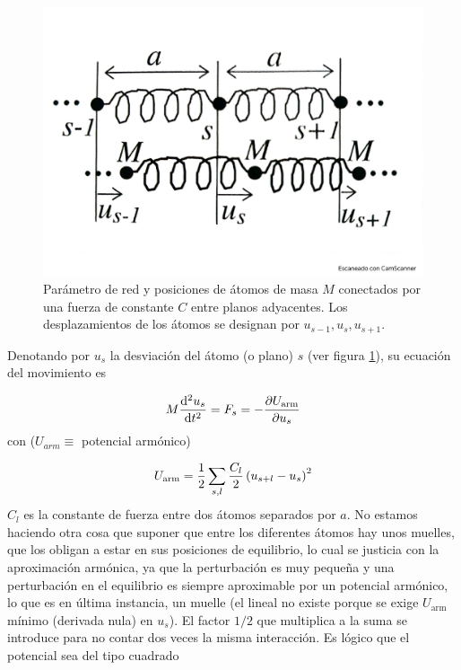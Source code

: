 \begin{figure}[h!] \centering
    \includegraphics[scale=0.35]{Cuerpo/Ch_04/Fotos libro 1.pdf}
    \caption{Parámetro de red y posiciones de átomos de masa $M$ conectados por una fuerza de constante $C$ entre planos adyacentes. Los desplazamientos de los átomos se designan por $u_{s-1},u_{s},u_{s+1}$.}
    \label{Fig:04-01}
\end{figure}    

Denotando por $u_s$ la desviación del átomo (o plano) $s$ (ver figura \ref{Fig:04-01}), su ecuación del movimiento es

\begin{equation}
	M \frac{\mathrm{d} ^2 u_s}{\mathrm{d} t^2} = F_s = - \frac{\partial U_{\text{arm}}}{\partial u_s} \label{Ec:04-01-02}
\end{equation}
con ($U_{arm} \equiv$ potencial armónico)

\begin{equation}
	U_{\text{arm}} = \frac{1}{2} \sum_{s,l} \frac{C_l}{2} \left( u_{s+l}-u_s \right)^2
\end{equation}
$C_l$ es la constante de fuerza entre dos átomos separados por $a$. No estamos haciendo otra cosa que suponer que entre los diferentes átomos hay unos muelles,  que los obligan a estar en sus posiciones de equilibrio, lo cual se justicia con la aproximación armónica, ya que la perturbación es muy pequeña y una perturbación en el equilibrio es siempre aproximable por un potencial armónico, lo que es en última instancia, un muelle (el lineal no existe porque se exige $U_{\text{arm}}$ mínimo (derivada nula) en $u_s$). El factor $1/2$ que multiplica a la suma se introduce para no contar dos veces la misma interacción. Es lógico que el potencial sea del tipo cuadrado 

